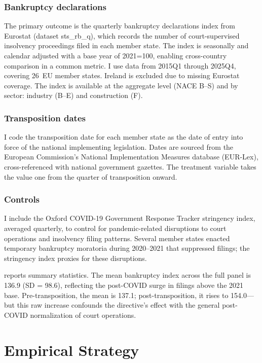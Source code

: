 \documentclass[12pt]{article}
\begin{document}
\subsubsection*{Bankruptcy declarations} The primary outcome is the quarterly bankruptcy declarations index from Eurostat (dataset sts\_rb\_q), which records the number of court-supervised insolvency proceedings filed in each member state. The index is seasonally and calendar adjusted with a base year of 2021=100, enabling cross-country comparison in a common metric. I use data from 2015Q1 through 2025Q4, covering 26~EU member states. Ireland is excluded due to missing Eurostat coverage. The index is available at the aggregate level (NACE B--S) and by sector: industry (B--E) and construction (F).

\subsubsection*{Transposition dates} I code the transposition date for each member state as the date of entry into force of the national implementing legislation. Dates are sourced from the European Commission's National Implementation Measures database (EUR-Lex), cross-referenced with national government gazettes. The treatment variable takes the value one from the quarter of transposition onward.

\subsubsection*{Controls} I include the Oxford COVID-19 Government Response Tracker stringency index, averaged quarterly, to control for pandemic-related disruptions to court operations and insolvency filing patterns. Several member states enacted temporary bankruptcy moratoria during 2020--2021 that suppressed filings; the stringency index proxies for these disruptions.

 reports summary statistics. The mean bankruptcy index across the full panel is 136.9 (SD = 98.6), reflecting the post-COVID surge in filings above the 2021 base. Pre-transposition, the mean is 137.1; post-transposition, it rises to 154.0---but this raw increase confounds the directive's effect with the general post-COVID normalization of court operations.




\section{Empirical Strategy}
\label{sec:method}
\end{document}
